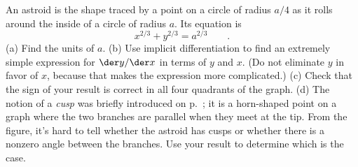 An astroid is the shape traced by a point on a circle of radius $a/4$ as it rolls
around the inside of a circle of radius $a$. Its equation is
\begin{equation*}
  x^{2/3}+y^{2/3} = a^{2/3} \qquad .
\end{equation*}
(a) Find the units of $a$.
(b) Use implicit differentiation to find
an extremely simple expression for $\der y/\der x$ in terms of $y$ and $x$.
(Do not eliminate $y$ in favor of $x$, because that makes the expression more complicated.)
(c) Check that the sign of your result is correct in all four quadrants of the graph.
(d) The notion of a \emph{cusp} was briefly introduced on p.~\pageref{fig:caustic};
it is a horn-shaped point on a graph where the two branches are parallel when they
meet at the tip. From the figure, it's hard to tell whether the astroid has cusps
or whether there is a nonzero angle between the branches. Use your result to determine
which is the case.
